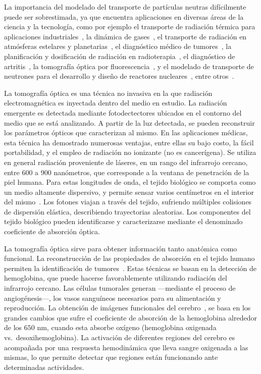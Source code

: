 La importancia del modelado del transporte de partículas neutras 
difícilmente puede ser sobrestimada, ya que encuentra aplicaciones 
en diversas áreas de la ciencia y la tecnología, 
como por ejemplo el transporte de radiación 
 térmica para aplicaciones industriales~\cite{Howell2010, Thynell1998}, 
 la dinámica de gases~\cite{Duderstadt1979}, 
 el transporte de radiación en atmósferas estelares y 
 planetarias~\cite{Qin2015, Dymond1997, Chandrasekhar1960}, 
 el diagnóstico médico de tumores~\cite{Zhu2005, Zhu2010, Fujii2016b}, 
 la planificación y dosificación de radiación en radioterapia~\cite{Vassiliev2010,Bedford2019}, 
 el diagnóstico de artritis~\cite{Klose2002, Netz2001}, 
 la tomografía óptica por fluorescencia~\cite{Klose2005,Klose2010, Ren2010},
 y el modelado de transporte de neutrones para el desarrollo 
 y diseño de reactores nucleares~\cite{Larsen2006, Sanchez1982, Anli2006}, 
 entre otros~\cite {Mishchenko1999, Prasher2003}. 
  
 La tomografía óptica es una técnica no invasiva en la que
 radiación electromagnética es inyectada dentro del medio
 en estudio.
 La radiación emergente es detectada mediante fotodectectores 
 ubicados en el contorno del medio que se está analizando. 
 A partir de la luz detectada, se pueden reconstruir
 los parámetros ópticos que caracterizan al mismo.
 En las aplicaciones médicas, esta técnica ha demostrado numerosas 
 ventajas, entre ellas su bajo costo, la fácil portabilidad, y 
 el empleo de radiación no ionizante (no es cancerígena). 
 Se utiliza en general radiación proveniente de láseres, en un 
 rango del infrarrojo cercano, entre 600 a 900 nanómetros, que 
 corresponde a la ventana de penetración de la piel humana.
 Para estas longitudes de onda, el tejido 
 biológico se comporta como un medio altamente dispersivo, y 
 permite sensar varios centímetros en el interior del mismo~\cite{Boas2001}.
Los fotones viajan a través del tejido, sufriendo múltiples colisiones 
 de dispersión elástica, describiendo trayectorias aleatorias.
 Los componentes del tejido biológico pueden identificarse y caracterizarse
 mediante el denominado coeficiente de absorción óptica.
 
La tomografía óptica sirve para obtener información tanto anatómica como funcional.
La reconstrucción de las propiedades de absorción en el tejido humano 
 permiten la identificación de tumores~\cite{Zhu2005, Zhu2010, Fujii2016b}.
Estas técnicas se basan en la detección de hemoglobina, que puede hacerse 
favorablemente utilizando radiación del infrarrojo cercano.
Las células tumorales generan ---mediante el proceso de angiogénesis---, 
los vasos sanguíneos necesarios para su alimentación y reproducción.
La obtención de imágenes funcionales del cerebro~\cite{Boas2001, bluestone2001, Arridge1999}, se basa en los grandes cambios 
que sufre el coeficiente de absorción de la hemoglobina 
alrededor de los $650$ nm, cuando esta absorbe oxígeno 
(hemoglobina oxigenada vs.~desoxihemoglobina). 
 La activación de diferentes regiones del cerebro 
 es acompañada por una respuesta hemodinámica que lleva sangre oxigenada 
 a las mismas, lo que permite detectar que regiones están funcionando 
 ante determinadas actividades. 
 
 
 
\pagestyle{empty}

%


